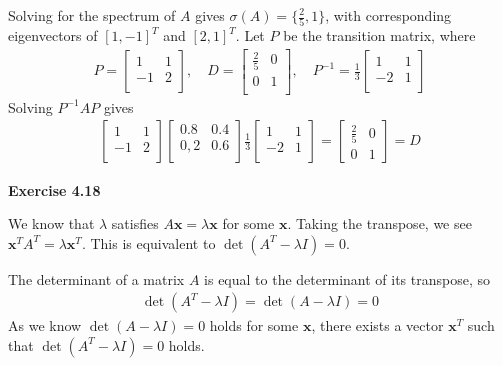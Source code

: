 \documentclass[letterpaper,12pt]{article}
\newcommand{\vect}[1]{\mathbf{#1}}
\begin{document}
Solving for the spectrum of $A$ gives $\sigma(A) = \{\frac{2}{5}, 1 \}$, with corresponding eigenvectors of $[1, -1]^T$ and $[2, 1]^T$. Let $P$ be the transition matrix, where
\begin{align*}
P =
\begin{bmatrix}
1 & 1 \\
-1 & 2 \\
\end{bmatrix},
\quad
D =
\begin{bmatrix}
\frac{2}{5} & 0 \\
0 & 1 \\
\end{bmatrix},
\quad
P^{-1} = \frac{1}{3}
\begin{bmatrix}
1 & 1 \\
-2 & 1 \\
\end{bmatrix}
\end{align*}
Solving $P^{-1}AP$ gives
\begin{align*}
\begin{bmatrix}
	1 & 1 \\
	-1 & 2 \\
\end{bmatrix}
\begin{bmatrix}
	0.8 & 0.4 \\
	0,2 & 0.6 \\
\end{bmatrix}
\frac{1}{3}
\begin{bmatrix}
	1 & 1 \\
	-2 & 1 \\
\end{bmatrix}
=
\begin{bmatrix}
\frac{2}{5} & 0 \\
0 & 1
\end{bmatrix}
= D
\end{align*}

\textbf{Exercise 4.18}

We know that $\lambda$ satisfies $A\vect{x} = \lambda \vect{x}$ for some $\vect{x}$. Taking the transpose, we see $\vect{x}^TA^T = \lambda \vect{x}^T$. This is equivalent to $\det(A^T - \lambda I) = 0$.

The determinant of a matrix $A$ is equal to the determinant of its transpose, so
\begin{align*}
\det(A^T - \lambda I) = \det(A - \lambda I) = 0
\end{align*}
As we know $\det(A - \lambda I) = 0$ holds for some $\vect{x}$, there exists a vector $\vect{x}^T$ such that $\det(A^T - \lambda I) = 0$ holds.
\end{document}
